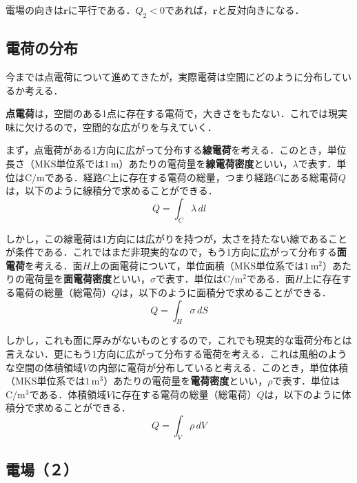 電場の向きは$\bm{r}$に平行である．$Q_2 < 0$であれば，$\bm{r}$と反対向きになる．



\subsection{電荷の分布}

今までは点電荷について進めてきたが，実際電荷は空間にどのように分布しているか考える．

\textbf{点電荷}は，空間のある1点に存在する電荷で，大きさをもたない．これでは現実味に欠けるので，空間的な広がりを与えていく．

まず，点電荷がある1方向に広がって分布する\textbf{線電荷}を考える．このとき，単位長さ（MKS単位系では$1\,\mathrm{m}$）あたりの電荷量を\textbf{線電荷密度}といい，$\lambda$で表す．単位は$\mathrm{C / m}$である．経路$C$上に存在する電荷の総量，つまり経路$C$にある総電荷$Q$は，以下のように線積分で求めることができる．
\begin{equation}
	Q = \int_{C} \lambda\,dl
\end{equation}

しかし，この線電荷は1方向には広がりを持つが，太さを持たない線であることが条件である．これではまだ非現実的なので，もう1方向に広がって分布する\textbf{面電荷}を考える．面$H$上の面電荷について，単位面積（MKS単位系では$1\,\mathrm{m^2}$）あたりの電荷量を\textbf{面電荷密度}といい，$\sigma$で表す．単位は$\mathrm{C / m^2}$である．面$H$上に存在する電荷の総量（総電荷）$Q$は，以下のように面積分で求めることができる．
\begin{equation}
	Q = \int_{H} \sigma\,dS
\end{equation}

しかし，これも面に厚みがないものとするので，これでも現実的な電荷分布とは言えない．更にもう1方向に広がって分布する電荷を考える．これは風船のような空間の体積領域$V$の内部に電荷が分布していると考える．このとき，単位体積（MKS単位系では$1\,\mathrm{m^3}$）あたりの電荷量を\textbf{電荷密度}といい，$\rho$で表す．単位は$\mathrm{C / m^3}$である．体積領域$V$に存在する電荷の総量（総電荷）$Q$は，以下のように体積分で求めることができる．
\begin{equation}
	Q = \int_{V} \rho\,dV
\end{equation}



\subsection{電場（２）}